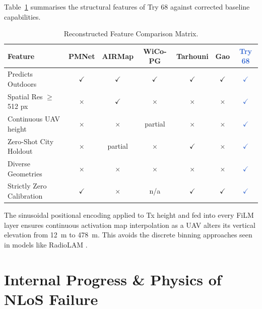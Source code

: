 \documentclass[11pt,a4paper]{article}
\newcommand{\ours}[1]{\textcolor{highlight}{\textbf{#1}}}
\newcommand{\yes}{$\checkmark$}
\newcommand{\no}{$\times$}
\begin{document}
Table~\ref{tab:novelty} summarises the structural features of Try 68 against corrected baseline capabilities. 

\begin{table}[h!]
\centering
\caption{Reconstructed Feature Comparison Matrix.}
\label{tab:novelty}
\small
\begin{tabular}{lcccccc}
\toprule
\textbf{Feature} & \textbf{PMNet} & \textbf{AIRMap} & \textbf{WiCo-PG}
    & \textbf{Tarhouni} & \textbf{Gao} & \ours{\textbf{Try 68}} \\
\midrule
Predicts Outdoors & \yes & \yes & \yes & \yes & \yes & \ours{\yes} \\
Spatial Res $\ge$ 512 px & \no & \yes & \no & \no & \no & \ours{\yes} \\
Continuous UAV height & \no & \no & partial & \no & \no & \ours{\yes} \\
Zero-Shot City Holdout & \no & partial & \no & \yes & \no & \ours{\yes} \\
Diverse Geometries & \no & \no & \no & \no & \no & \ours{\yes} \\
Strictly Zero Calibration & \yes & \no & n/a & \yes & \yes & \ours{\yes} \\
\bottomrule
\end{tabular}
\end{table}

The sinusoidal positional encoding applied to Tx height and fed into every FiLM layer ensures continuous activation map interpolation as a UAV alters its vertical elevation from 12~m to 478~m. This avoids the discrete binning approaches seen in models like RadioLAM \cite{radiolam2025}.

\section{Internal Progress \& Physics of NLoS Failure}
\label{sec:progress}
\end{document}
